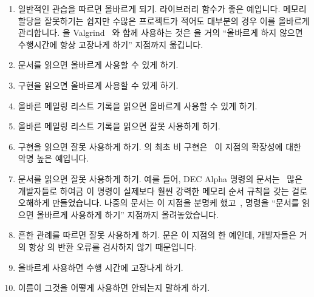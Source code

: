 \begin{enumerate}
\item	일반적인 관습을 따르면 올바르게 되기.
	 라이브러리 함수가 좋은 예입니다.
	메모리 할당을 잘못하기는 쉽지만 수많은 프로젝트가 적어도 대부분의 경우
	이를 올바르게 관리합니다.
	 을 Valgrind~\cite{ValgrindHomePage} 와 함께 사용하는 것은
	 을 거의 ``올바르게 하지 않으면 수행시간에 항상 고장나게
	하기'' 지점까지 옮깁니다.
\item	문서를 읽으면 올바르게 사용할 수 있게 하기.
\item	구현을 읽으면 올바르게 사용할 수 있게 하기.
\item	올바른 메일링 리스트 기록을 읽으면 올바르게 사용할 수 있게 하기.
\item	올바른 메일링 리스트 기록을 읽으면 잘못 사용하게 하기.
\item	구현을 읽으면 잘못 사용하게 하기.
	 의 최초 비 
	구현은~\cite{PaulEMcKenney2007PreemptibleRCU} 이 지점의 확장성에 대한
	악명 높은 예입니다.

\item	문서를 읽으면 잘못 사용하게 하기.
	예를 들어, DEC Alpha  명령의 문서는~\cite{ALPHA2002} 많은
	개발자들로 하여금 이 명령이 실제보다 훨씬 강력한 메모리 순서 규칙을
	갖는 걸로 오해하게 만들었습니다.
	나중의 문서는 이 지점을 분명케
	했고~\cite{Compaq01,WilliamPugh2000Gharachorloo},  명령을
	``문서를 읽으면 올바르게 사용하게 하기'' 지점까지 올려놓았습니다.
\item	흔한 관례를 따르면 잘못 사용하게 하기.
	 문은 이 지점의 한 예인데, 개발자들은 거의 항상
	 의 반환 오류를 검사하지 않기 때문입니다.
\item	올바르게 사용하면 수행 시간에 고장나게 하기.
\item	이름이 그것을 어떻게 사용하면 안되는지 말하게 하기.


\end{enumerate}
